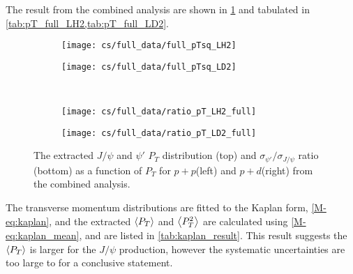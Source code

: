 \documentclass[../main.tex]{subfiles}
\begin{document}
The result from the combined analysis are shown in \cref{fig:pT_combined} and tabulated in \cref{tab:pT_full_LH2,tab:pT_full_LD2}.
\begin{figure}[h!]
	\centering
	\begin{subfigure}{0.45\linewidth}
		\texttt{[image: cs/full\_data/full\_pTsq\_LH2]}
	\end{subfigure}
	\begin{subfigure}{0.45\linewidth}
		\texttt{[image: cs/full\_data/full\_pTsq\_LD2]}
	\end{subfigure}
	\\
	\begin{subfigure}{0.45\linewidth}
		\texttt{[image: cs/full\_data/ratio\_pT\_LH2\_full]}
	\end{subfigure}
	\begin{subfigure}{0.45\linewidth}
		\texttt{[image: cs/full\_data/ratio\_pT\_LD2\_full]}
	\end{subfigure}
	\caption{The extracted $J/\psi$ and $\psi'$ $P_T$ distribution (top) and $\sigma_{\psi'}/\sigma_{J/\psi}$
		ratio (bottom) as a function of $P_T$ for $p+p$(left) and $p+d$(right) from
		the combined analysis.}
	\label{fig:pT_combined}
\end{figure}
\begin{table}[h!]
	\centering
	\caption{Cross section $d\sigma/dp^2_T$ (in \unit{\nano\barn\GeV^{-2} nucleon^{-1}}) and the
		$\sigma_{\psi'}/\sigma_{J/\psi}$ ratio for $p+p$ extracted from the combined analysis, with
		their statistical and systematic uncertainties and the $\expval{p_T}$ (in \unit{\GeV})in each bin.}
	
	\label{tab:pT_full_LH2}
\end{table}
\begin{table}[h!]
	\centering
	\caption{Cross section $d\sigma/dp^2_T$ (in \unit{\nano\barn\GeV^{-2} nucleon^{-1}}) and the
		$\sigma_{\psi'}/\sigma_{J/\psi}$ ratio for $p+d$ extracted from the combined analysis, with
		their statistical and systematic uncertainties and the $\expval{p_T}$ (in \unit{\GeV})in each bin.}
	
	\label{tab:pT_full_LD2}
\end{table}

The transverse momentum distributions are fitted to the Kaplan form, \cref{M-eq:kaplan}, and the extracted
$\expval{P_T}$ and $\expval{P^2_T}$ are calculated using \cref{M-eq:kaplan_mean},
and are listed in \cref{tab:kaplan_result}. This result suggests the
$\expval{P_T}$ is larger for the $J/\psi$ production, however the systematic uncertainties are too
large to for a conclusive statement.
\end{document}
